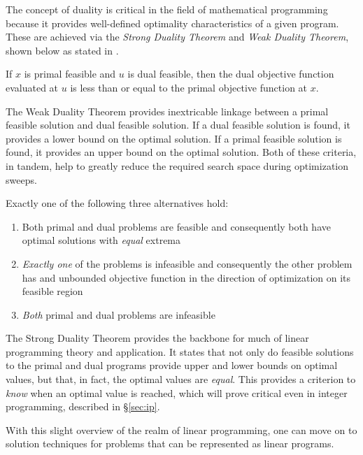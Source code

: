 The concept of duality is critical in the field of mathematical programming
because it provides well-defined optimality characteristics of a given
program. These are achieved via the \textit{Strong Duality Theorem}
and \textit{Weak Duality Theorem}, shown below as stated
in \cite{ferris_linear_2008}.

\begin{thm}
If $x$ is primal feasible and $u$ is dual feasible, then the dual objective
function evaluated at $u$ is less than or equal to the primal objective function
at $x$.
\end{thm}

The Weak Duality Theorem provides inextricable linkage between a primal feasible
solution and dual feasible solution. If a dual feasible solution is found, it
provides a lower bound on the optimal solution. If a primal feasible solution is
found, it provides an upper bound on the optimal solution. Both of these
criteria, in tandem, help to greatly reduce the required search space during
optimization sweeps.

\begin{thm}
Exactly one of the following three alternatives hold:
\begin{enumerate}

  \item Both primal and dual problems are feasible and consequently both have
  optimal solutions with \textit{equal} extrema

  \item \textit{Exactly one} of the problems is infeasible and consequently the
  other problem has and unbounded objective function in the direction of
  optimization on its feasible region

  \item \textit{Both} primal and dual problems are infeasible

\end{enumerate}
\end{thm}

The Strong Duality Theorem provides the backbone for much of linear programming
theory and application. It states that not only do feasible solutions to the
primal and dual programs provide upper and lower bounds on optimal values, but
that, in fact, the optimal values are \textit{equal}. This provides a criterion
to \textit{know} when an optimal value is reached, which will prove critical
even in integer programming, described in \S \ref{sec:ip}.

With this slight overview of the realm of linear programming, one can move on to
solution techniques for problems that can be represented as linear programs.
